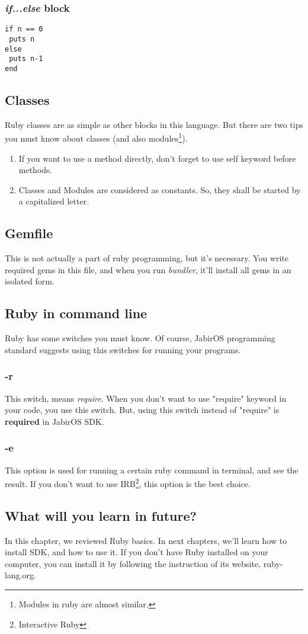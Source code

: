 \documentclass[11pt]{article}
\begin{document}
\subsubsection{\textit{if...else} block}

\begin{verbatim}
if n == 0
 puts n
else
 puts n-1
end
\end{verbatim}

\subsection{Classes}
Ruby classes are as simple as other blocks in this language. But there are two tips you must know about classes (and also modules\footnote{Modules in ruby are almost similar. }). 
\begin{enumerate}
\item If you want to use a method directly, don't forget to use self keyword before methods.
\item Classes and Modules are considered as constants. So, they shall be started by a capitalized letter.
\end{enumerate}

\subsection{Gemfile}
This is not actually a part of ruby programming, but it's necessary. You write required gems in this file, and when you run \textit{bundler}, it'll install all gems in an isolated form. 
\subsection{Ruby in command line}
Ruby has some switches you must know. Of course, JabirOS programming standard suggests using this switches for running your programs. 
\subsubsection{-r}
This switch, means \textit{require}. When you don't want to use "require" keyword in your code, you use this switch. But, using this switch instead of "require" is \textbf{required} in JabirOS SDK. 
\subsubsection{-e}
This option is used for running a certain ruby command in terminal, and see the result. If you don't want to use IRB\footnote{Interactive Ruby}, this option is the best choice. 

\subsection{What will you learn in future?}
In this chapter, we reviewed Ruby basics. In next chapters, we'll learn how to install SDK, and how to use it. If you don't have Ruby installed on your computer, you can install it by following the instruction of its website, ruby-lang.org. 
\newpage
\end{document}
